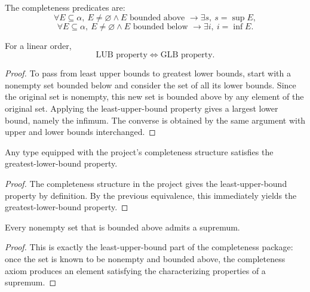\begin{definition}
\label{def:completeness-properties}
The completeness predicates are:
\[
\forall E \subseteq \alpha,\ E \neq \varnothing \land E \text{ bounded above }
\to \exists s,\ s = \sup E,
\]
\[
\forall E \subseteq \alpha,\ E \neq \varnothing \land E \text{ bounded below }
\to \exists i,\ i = \inf E.
\]
\end{definition}

\begin{theorem}
\label{thm:lub-glb-equivalent}
For a linear order,
\[
\text{LUB property} \iff \text{GLB property}.
\]
\begin{proof}
To pass from least upper bounds to greatest lower bounds, start with a nonempty set bounded
below and consider the set of all its lower bounds. Since the original set is nonempty, this
new set is bounded above by any element of the original set. Applying the least-upper-bound
property gives a largest lower bound, namely the infimum. The converse is obtained by the same
argument with upper and lower bounds interchanged.
\end{proof}
\end{theorem}

\begin{theorem}
\label{thm:inf-exists-from-complete}
Any type equipped with the project's completeness structure satisfies the
greatest-lower-bound property.
\begin{proof}
The completeness structure in the project gives the least-upper-bound property by definition.
By the previous equivalence, this immediately yields the greatest-lower-bound property.
\end{proof}
\end{theorem}

\begin{theorem}
\label{thm:sup-characterization}
Every nonempty set that is bounded above admits a supremum.
\begin{proof}
This is exactly the least-upper-bound part of the completeness package: once the set is known
to be nonempty and bounded above, the completeness axiom produces an element satisfying the
characterizing properties of a supremum.
\end{proof}
\end{theorem}

